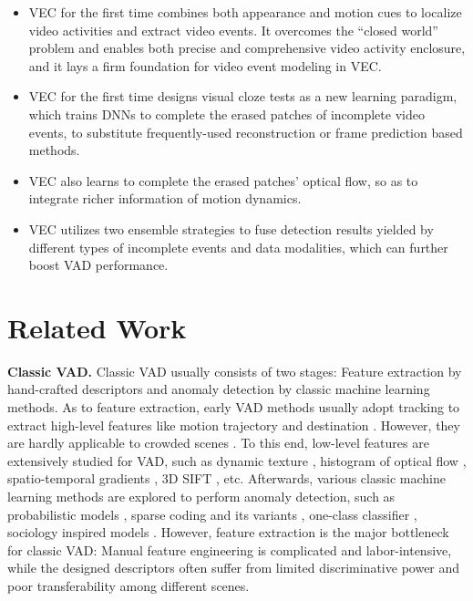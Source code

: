 \documentclass[sigconf]{acmart}
\begin{document}
\begin{itemize}
	\item VEC for the first time combines both appearance and motion cues to localize video activities and extract video events. It overcomes the ``closed world'' problem and enables both precise and comprehensive video activity enclosure, and it lays a firm foundation for video event modeling in VEC.
	
	\item VEC for the first time designs visual cloze tests as a new learning paradigm, which trains DNNs to complete the erased patches of incomplete video events, to substitute frequently-used reconstruction or frame prediction based methods.
	
	\item VEC also learns to complete the erased patches' optical flow, so as to integrate richer information of motion dynamics.
	
	\item VEC utilizes two ensemble strategies to fuse detection results yielded by different types of incomplete events and data modalities, which can further boost VAD performance.
\end{itemize}

\section{Related Work}
\label{sec:related_work}
\quad\textbf{Classic VAD.}
Classic VAD usually consists of two stages: Feature extraction by hand-crafted descriptors and anomaly detection by classic machine learning methods. As to feature extraction, early VAD methods usually adopt tracking \cite{lan2020semi} to extract high-level features like motion trajectory \cite{zhang2009learning, piciarelli2008trajectory} and destination \cite{basharat2008learning}. However, they are hardly applicable to crowded scenes \cite{mahadevan2010anomaly}. To this end, low-level features are extensively studied for VAD, such as dynamic texture \cite{mahadevan2010anomaly}, histogram of optical flow \cite{cong2011sparse}, spatio-temporal gradients \cite{lu2013abnormal, kratz2009anomaly}, 3D SIFT \cite{cheng2015video}, etc. Afterwards, various classic machine learning methods are explored to perform anomaly detection, such as probabilistic models \cite{mahadevan2010anomaly,cheng2015video,antic2011video}, sparse coding and its variants \cite{cong2011sparse,lu2013abnormal,zhao2011online}, one-class classifier \cite{yin2008sensor}, sociology inspired models \cite{Mehran2009Abnormal}. However, feature extraction is the major bottleneck for classic VAD: Manual feature engineering is complicated and labor-intensive, while the designed descriptors often suffer from limited discriminative power and poor transferability among different scenes.
\end{document}
